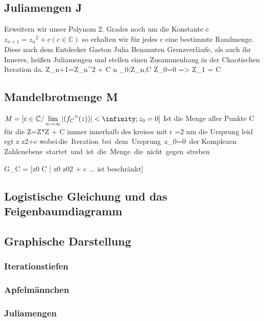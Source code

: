 \documentclass{article}
\begin{document}
\subsection{Juliamengen J}
Erweitern wir unser Polynom 2. Grades noch um die Konstante c $ z_{n+1}={z_{n}}^2 +c (c \in \mathbb{C})$ so erhalten wir für jedes c eine bestimmte Randmenge. Diese nach dem Entdecker Gaston Julia Benannten Grenzverläufe, als auch ihr Inneres, heißen Juliamengen und stellen einen Zusammenhang in der Chaotischen Iteration da.
\newline Z_{n+1}={Z_{n}}^2 + C 
\newline n \in {}_{0};Z_n,C \in {}
\newline Z_0=0 =>  Z_1 = C

\subsection{Mandelbrotmenge M}
\newline
{}
$M = [c \in \mathbb{C} / \lim\limits_{n \rightarrow \infty}{|({f_{C}}^{n}(z))|< \infinity ; z_{0}=0  }]$
\newline Ist die Menge aller Punkte C für die Z=Z*Z + C immer innerhalb des kreises mit r =2 um die Ursprung leid egt 
\newline z \rightarrow z2+c 
\newline wobei\,die\, Iteration\, bei\, dem\, Ursprung\, z_{0}=0\, der Komplexen\, Zahlenebene\, startet\, und\, ist\, die\, Menge\, die\, nicht\, gegen\, \infinity streben


G_{C} = [z0 \in C | z0 \rightarrow z02 + c \rightarrow ... ist beschränkt]

\subsection{Logistische Gleichung und das Feigenbaumdiagramm}

\subsection{Graphische Darstellung}

\subsubsection{Iterationstiefen}

\subsubsection{Apfelmännchen}

\subsubsection{Juliamengen}
\end{document}
